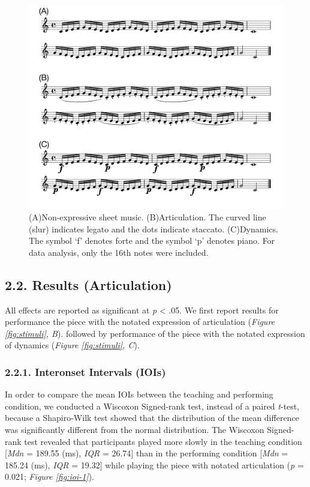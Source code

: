 \documentclass[
  english,
  man,floatsintext]{apa6}
\begin{document}
\begin{figure}
\includegraphics[width=1\linewidth]{manuscript_files/figure-latex/stim-1-1} \caption{\label{fig:stimuli}(A)Non-expressive sheet music. (B)Articulation. The curved line (slur) indicates legato and the dots indicate staccato. (C)Dynamics. The symbol `f' denotes forte and the symbol `p' denotes piano. For data analysis, only the 16th notes were included.}\label{fig:stim-1}
\end{figure}

\newpage

\hypertarget{results-articulation}{%
\subsection{2.2. Results (Articulation)}\label{results-articulation}}

All effects are reported as significant at \emph{p} \textless{} .05. We first report results for performance the piece with the notated expression of articulation (\emph{Figure \ref{fig:stimuli}, B}). followed by performance of the piece with the notated expression of dynamics (\emph{Figure \ref{fig:stimuli}, C}).

\hypertarget{interonset-intervals-iois}{%
\subsubsection{2.2.1. Interonset Intervals (IOIs)}\label{interonset-intervals-iois}}

In order to compare the mean IOIs between the teaching and performing condition, we conducted a Wiscoxon Signed-rank test, instead of a paired \emph{t}-test, because a Shapiro-Wilk test showed that the distribution of the mean difference was significantly different from the normal distribution. The Wiscoxon Signed-rank test revealed that participants played more slowly in the teaching condition {[}\emph{Mdn} = 189.55 (ms), \emph{IQR} = 26.74{]} than in the performing condition {[}\emph{Mdn} = 185.24 (ms), \emph{IQR} = 19.32{]} while playing the piece with notated articulation (\emph{p} = 0.021; \emph{Figure \ref{fig:ioi-1}}).
\end{document}
